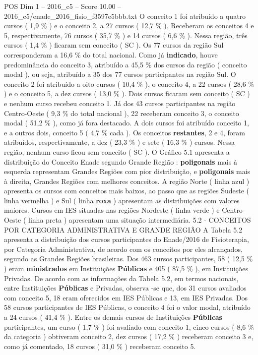\begin{textsample}{POS Dim 1 – 2016\_c5 – Score 10.00 – 2016\_c5/enade\_2016\_fisio\_f3597e5bbb.txt}
O conceito 1 foi atribuído a quatro cursos ( 1,9 \% ) e o conceito 2, a 27 cursos ( 12,7 \% ).
Receberam os conceitos 4 e 5, respectivamente, 76 cursos ( 35,7 \% ) e 14 cursos ( 6,6 \% ).
Nessa região, três cursos ( 1,4 \% ) ficaram sem conceito ( SC ).
Os 77 cursos da região Sul corresponderam a 16,6 \% do total nacional.
Como já \textbf{indicado}, houve predominância do conceito 3, atribuído a 45,5 \% dos cursos da região ( conceito modal ), ou seja, atribuído a 35 dos 77 cursos participantes na região Sul.
O conceito 2 foi atribuído a oito cursos ( 10,4 \% ), o conceito 4, a 22 cursos ( 28,6 \% ) e o conceito 5, a dez cursos ( 13,0 \% ).
Dois cursos ficaram sem conceito ( SC ) e nenhum curso recebeu conceito 1.
Já dos 43 cursos participantes na região Centro-Oeste ( 9,3 \% do total nacional ), 22 receberam conceito 3, o conceito modal ( 51,2 \% ), como já fora destacado.
A dois cursos foi atribuído conceito 1, e a outros dois, conceito 5 ( 4,7 \% cada ).
Os conceitos \textbf{restantes}, 2 e 4, foram atribuídos, respectivamente, a dez ( 23,3 \% ) e sete ( 16,3 \% ) cursos.
Nessa região, nenhum curso ficou sem conceito ( SC ).
O Gráfico 5.1 apresenta a distribuição do Conceito Enade segundo Grande Região : \textbf{poligonais} mais à esquerda representam Grandes Regiões com pior distribuição, e \textbf{poligonais} mais à direita, Grandes Regiões com melhores conceitos.
A região Norte ( linha azul ) apresenta os cursos com conceitos mais baixos, ao passo que as regiões Sudeste ( linha vermelha ) e Sul ( linha \textbf{roxa} ) apresentam as distribuições com valores maiores.
Cursos em IES situadas nas regiões Nordeste ( linha verde ) e Centro-Oeste ( linha preta ) apresentam uma situação intermediária. 5.2 - CONCEITOS POR CATEGORIA ADMINISTRATIVA E GRANDE REGIÃO A Tabela 5.2 apresenta a distribuição dos cursos participantes do Enade/2016 de Fisioterapia, por Categoria Administrativa, de acordo com os conceitos por eles alcançados, segundo as Grandes Regiões brasileiras.
Dos 463 cursos participantes, 58 ( 12,5 \% ) eram \textbf{ministrados} em Instituições \textbf{Públicas} e 405 ( 87,5 \% ), em Instituições Privadas.
De acordo com as informações da Tabela 5.2, em termos nacionais, entre Instituições \textbf{Públicas} e Privadas, observa -se que, dos 31 cursos avaliados com conceito 5, 18 eram oferecidos em IES Públicas e 13, em IES Privadas.
Dos 58 cursos participantes de IES Públicas, o conceito 4 foi o valor modal, atribuído a 24 cursos ( 41,4 \% ).
Entre os demais cursos de Instituições \textbf{Públicas} participantes, um curso ( 1,7 \% ) foi avaliado com conceito 1, cinco cursos ( 8,6 \% da categoria ) obtiveram conceito 2, dez cursos ( 17,2 \% ) receberam conceito 3 e, como já comentado, 18 cursos ( 31,0 \% ) receberam conceito 5.

\end{textsample}
